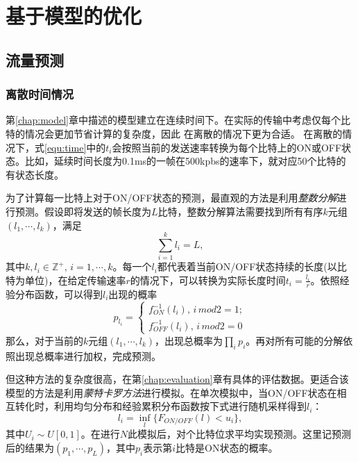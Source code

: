 
\chapter{基于模型的优化}
\label{chap:optimization}
\section{流量预测}
\subsection{离散时间情况}
第\ref{chap:model}章中描述的模型建立在连续时间下。在实际的传输中考虑仅每个比特的情况会更加节省计算的复杂度，因此
在离散的情况下更为合适。
在离散的情况下，式\ref{equ:time}中的$t_i$会按照当前的发送速率转换为每个比特上的ON或OFF状态。比如，延续时间长度为0.1ms的一帧在500kpbs的速率下，就对应50个比特的有状态长度。

为了计算每一比特上对于ON/OFF状态的预测，最直观的方法是利用\emph{整数分解}进行预测。假设即将发送的帧长度为$L$比特，整数分解算法需要找到所有有序$k$元组$(l_1, \cdots, l_k)$，满足
\begin{equation}
	\sum_{i = 1}^{k} l_i = L,
\end{equation}
其中$k,l_i \in \mathbb{Z}^+,\,i = 1,\cdots,k$。每一个$l_i$都代表着当前ON/OFF状态持续的长度(以比特为单位)，在给定传输速率$r$的情况下，可以转换为实际长度时间$t_i = \frac{l_i}{r}$。依照经验分布函数，可以得到$l_i$出现的概率
\begin{equation}
p_{l_i} = 
\begin{cases}
f_{ON}^{-1}(l_i), \,i\, mod 2 = 1;\\
f_{OFF}^{-1}(l_i), \,i\, mod 2 = 0
\end{cases}
\end{equation}
那么，对于当前的$k$元组$(l_1, \cdots, l_k)$，出现总概率为$\prod_{i}p_i$。再对所有可能的分解依照出现总概率进行加权，完成预测。

但这种方法的复杂度很高，在第\ref{chap:evaluation}章有具体的评估数据。更适合该模型的方法是利用\emph{蒙特卡罗方法}进行模拟。在单次模拟中，当ON/OFF状态在相互转化时，利用均匀分布和经验累积分布函数按下式进行随机采样得到$l_i$：
\begin{equation}
l_i = \inf_l\{F_{ON/OFF}(l) < u_i\},
\end{equation}
其中$U_i \sim U[0,1]$。在进行$N$此模拟后，对个比特位求平均实现预测。这里记预测后的结果为$(p_1, \cdots, p_L)$，其中$p_i$表示第$i$比特是ON状态的概率。

